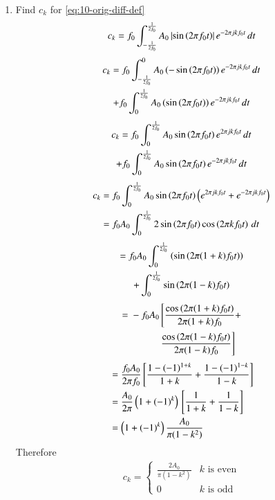 \documentclass[journal,12pt,twocolumn]{IEEEtran}
\renewcommand\thesection{\arabic{section}}
\begin{document}
\begin{enumerate}[label=\thesection.\arabic*,ref=\thesection.\theenumi]
\item Find $c_k$ for 
\eqref{eq:10-orig-diff-def}
\solution
\begin{align}
c_k = f_0\int_{-\frac{1}{2f_0}}^{\frac{1}{2f_0}}A_0\left\vert\sin\left(2\pi f_0 t\right)\right\vert e^{-2 \pi j kf_0 t}\, dt
\end{align}
\begin{multline}
c_k = f_0\int_{-\frac{1}{2f_0}}^{0}A_0\left(-\sin\left(2\pi f_0 t\right)\right)e^{-2 \pi j kf_0 t}\,dt \\ +f_0 \int_{0}^{\frac{1}{2f_0}}A_0\left(\sin\left(2\pi f_0 t\right)\right)e^{-2 \pi j kf_0 t}\, dt
\end{multline}
\begin{multline}
c_k = f_0\int_{0}^{\frac{1}{2f_0}}A_0\sin\left(2\pi f_0 t\right)e^{2\pi j kf_0 t}\, dt \\ +f_0\int_{0}^{\frac{1}{2f_0}}A_0\sin\left(2\pi f_0 t\right)e^{-2 \pi j kf_0 t}\, dt
\end{multline}
\begin{align}
c_k &= f_0 \int_{0}^{\frac{1}{2f_0}} A_0\sin\left(2\pi f_0 t\right) \left(e^{2 \pi j kf_0 t} + e^{-2 \pi j kf_0 t}\right) \\
&= f_0A_0 \int_{0}^{\frac{1}{2f_0}} 2\sin\left(2\pi f_0 t\right) \cos\left(2\pi k f_0 t\right) \, dt 
\end{align}
\begin{multline}
	= f_0A_0 \int_{0}^{\frac{1}{2f_0}} \left(\sin{\ensuremath{\left(2\pi(1+k)f_0t\right)}}\right) \\
	+ \int_{0}^{\frac{1}{2 f_0}} \sin{\ensuremath{\left(2\pi(1-k)f_0t\right)}}   
\end{multline}
\begin{align}
\begin{split}
	= {} -f_0A_0 \, &\Bigg[ \frac{\cos\left(2\pi(1+k)f_0t\right)}{2\pi(1+k)f_0} + \\ &\frac{\cos\left(2\pi(1-k)f_0t\right)}{2\pi(1-k)f_0} \Bigg]
\end{split}
\end{align}
\begin{align}
&= \frac{f_0A_0}{2\pi f_0} {}\left[\frac{1-(-1)^{1+k}}{1+k} + \frac{1-(-1)^{1-k}}{1-k}\right] \\
&= \frac{A_0}{2 \pi} \left(1 + (-1)^k\right)  {}\left[\frac{1}{1+k} + \frac{1}{1-k}\right] \\
&= \left(1 + (-1)^k\right) \frac{A_0}{\pi(1-k^2)}
\end{align}
Therefore
\begin{align}
c_k = 
\begin{cases}
	\frac{2A_0}{\pi(1-k^2)} & k \text{ is even} \\
	0 & k \text{ is odd} 
\end{cases}
\label{eq:c_k}
\end{align}



\end{enumerate}
\end{document}
